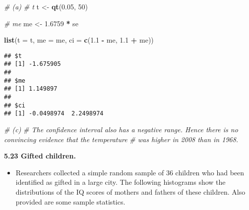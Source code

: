 \documentclass[]{book}
\newenvironment{Shaded}{\begin{snugshade}}{\end{snugshade}}
\newcommand{\CommentTok}[1]{\textcolor[rgb]{0.56,0.35,0.01}{\textit{#1}}}
\newcommand{\DataTypeTok}[1]{\textcolor[rgb]{0.13,0.29,0.53}{#1}}
\newcommand{\DecValTok}[1]{\textcolor[rgb]{0.00,0.00,0.81}{#1}}
\newcommand{\FloatTok}[1]{\textcolor[rgb]{0.00,0.00,0.81}{#1}}
\newcommand{\KeywordTok}[1]{\textcolor[rgb]{0.13,0.29,0.53}{\textbf{#1}}}
\newcommand{\NormalTok}[1]{#1}
\newcommand{\OperatorTok}[1]{\textcolor[rgb]{0.81,0.36,0.00}{\textbf{#1}}}
\newcommand{\StringTok}[1]{\textcolor[rgb]{0.31,0.60,0.02}{#1}}
\providecommand{\tightlist}{%
  \setlength{\itemsep}{0pt}\setlength{\parskip}{0pt}}
\begin{document}
\begin{Shaded}
\begin{Highlighting}[]
\CommentTok{# (a)}
\CommentTok{# t}
\NormalTok{t <-}\StringTok{ }\KeywordTok{qt}\NormalTok{(}\FloatTok{0.05}\NormalTok{, }\DecValTok{50}\NormalTok{)}

\CommentTok{# me}
\NormalTok{me <-}\StringTok{ }\FloatTok{1.6759} \OperatorTok{*}\StringTok{ }\NormalTok{se}

\KeywordTok{list}\NormalTok{(}\DataTypeTok{t =}\NormalTok{ t, }\DataTypeTok{me =}\NormalTok{ me, }\DataTypeTok{ci =} \KeywordTok{c}\NormalTok{(}\FloatTok{1.1} \OperatorTok{-}\StringTok{ }\NormalTok{me, }\FloatTok{1.1} \OperatorTok{+}\StringTok{ }\NormalTok{me))}
\end{Highlighting}
\end{Shaded}

\begin{verbatim}
## $t
## [1] -1.675905
## 
## $me
## [1] 1.149897
## 
## $ci
## [1] -0.0498974  2.2498974
\end{verbatim}

\begin{Shaded}
\end{Shaded}

\begin{Shaded}
\begin{Highlighting}[]
\CommentTok{# (c)}
\CommentTok{# The confidence interval also has a negative range. Hence there is no convincing evidence that the temperature }
\CommentTok{# was higher in 2008 than in 1968.}
\end{Highlighting}
\end{Shaded}

\textbf{5.23 Gifted children.}

\begin{itemize}
\tightlist
\item
  Researchers collected a simple random sample of 36 children who had been identified as gifted in a large city. The following histograms show the distributions of the IQ scores of mothers and fathers of these children. Also provided are some sample statistics.
\end{itemize}
\end{document}
